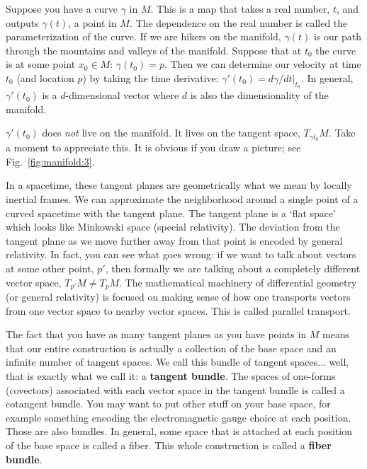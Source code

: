 \documentclass[
  11pt,
	colorful,
	raggedright,
]{tufte-style-thesis-flip}
\begin{document}
Suppose you have a curve $\gamma$ in $M$. This is a map that takes a real number, $t$, and outputs $\gamma(t)$, a point in $M$. The dependence on the real number is called the parameterization of the curve. If we are hikers on the manifold, $\gamma(t)$ is our path through the mountains and valleys of the manifold. Suppose that at $t_0$ the curve is at some point $x_0\in M$: $\gamma(t_0) = p$. Then we can determine our velocity at time $t_0$ (and location $p$) by taking the time derivative: $\gamma'(t_0) = \left.d\gamma/dt\right|_{t_0}$. In general, $\gamma'(t_0)$ is a $d$-dimensional vector where $d$ is also the dimensionality of the manifold. 

$\gamma'(t_0)$ does \emph{not} live on the manifold. It lives on the tangent space, $T_{\gamma{t_0}}M$. Take a moment to appreciate this. It is obvious if you draw a picture; see Fig.~\ref{fig:manifold:3}.

In a spacetime, these tangent planes are geometrically what we mean by locally inertial frames. We can approximate the neighborhood around a single point of a curved spacetime with the tangent plane. The tangent plane is a `flat space' which looks like Minkowski space (special relativity). The deviation from the tangent plane as we move further away from that point is encoded by general relativity. In fact, you can see what goes wrong: if we want to talk about vectors at some other point, $p'$, then formally we are talking about a completely different vector space, $T_{p'}M \neq T_pM$. The mathematical machinery of differential geometry (or general relativity) is focused on making sense of how one transports vectors from one vector space to nearby vector spaces. This is called parallel transport.

The fact that you have as many tangent planes as you have points in $M$ means that our entire construction is actually a collection of the base space and an infinite number of tangent spaces. We call this bundle of tangent spaces... well, that is exactly what we call it: a \textbf{tangent bundle}. The spaces of one-forms (covectors) associated with each vector space in the tangent bundle is called a cotangent bundle. You may want to put other stuff on your base space, for example something encoding the electromagnetic gauge choice at each position. Those are also bundles. In general, some space that is attached at each position of the base space is called a fiber. This whole construction is called a \textbf{fiber bundle}.
\end{document}

